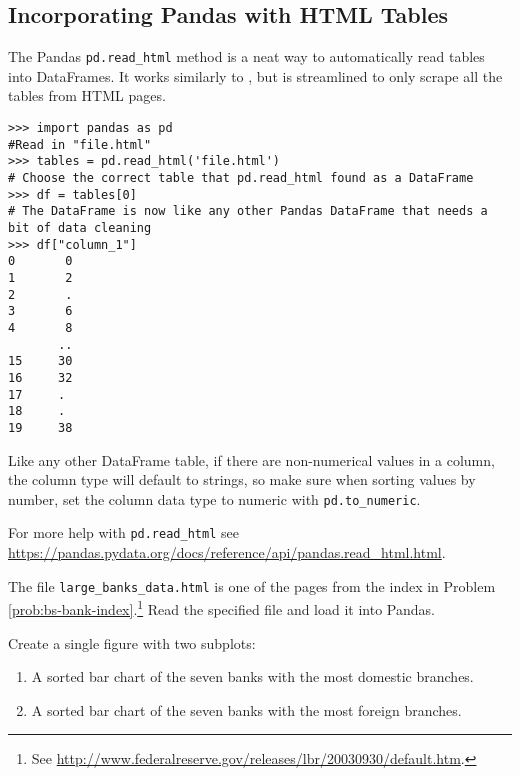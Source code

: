 \subsection*{Incorporating Pandas with HTML Tables} %
The Pandas \texttt{pd.read\_html} method is a neat way to automatically read tables into DataFrames. It works similarly to , but is streamlined to only scrape all the tables from HTML pages.
\begin{lstlisting}
>>> import pandas as pd
#Read in "file.html"
>>> tables = pd.read_html('file.html')
# Choose the correct table that pd.read_html found as a DataFrame
>>> df = tables[0]  
# The DataFrame is now like any other Pandas DataFrame that needs a bit of data cleaning
>>> df["column_1"] 
0       0
1       2
2       .
3       6
4       8
       .. 
15     30
16     32
17     .
18     .
19     38

\end{lstlisting}
Like any other DataFrame table, if there are non-numerical values in a column, the column type will default to strings, so make sure when sorting values by number, set the column data type to numeric with \texttt{pd.to\_numeric}. 

For more help with \texttt{pd.read\_html} see \url{https://pandas.pydata.org/docs/reference/api/pandas.read_html.html}.

\begin{problem} %
The file \texttt{large\_banks\_data.html} is one of the pages from the index in Problem \ref{prob:bs-bank-index}.\footnote{See \url{http://www.federalreserve.gov/releases/lbr/20030930/default.htm}.}
Read the specified file and load it into Pandas.

Create a single figure with two subplots:
\begin{enumerate}
    \item A sorted bar chart of the seven banks with the most domestic branches.
    \item A sorted bar chart of the seven banks with the most foreign branches.
\end{enumerate}
\end{problem}
